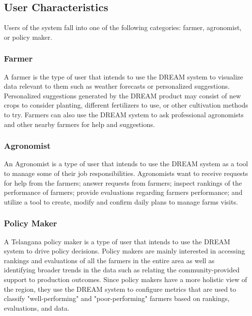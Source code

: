 \subsection{User Characteristics}
\begin{flushleft}
Users of the system fall into one of the following categories: farmer, agronomist, or policy maker.
\subsubsection{Farmer}
A farmer is the type of user that intends to use the DREAM system to visualize data relevant to them such as weather forecasts or personalized suggestions. Personalized suggestions generated by the DREAM product may consist of new crops to consider planting, different fertilizers to use, or other cultivation methods to try. Farmers can also use the DREAM system to ask professional agronomists and other nearby farmers for help and suggestions.\\
\subsubsection{Agronomist}
An Agronomist is a type of user that intends to use the DREAM system as a tool to manage some of their job responsibilities. Agronomists want to receive requests for help from the farmers; answer requests from farmers; inspect rankings of the performance of farmers; provide evaluations regarding farmers performance; and utilize a tool to create, modify and confirm daily plans to manage farms visits.
\subsubsection{Policy Maker}
A Telangana policy maker is a type of user that intends to use the DREAM system to drive policy decisions. Policy makers are mainly interested in accessing rankings and evaluations of all the farmers in the entire area as well as identifying broader trends in the data such as relating the community-provided support to production outcomes. Since policy makers have a more holistic view of the region, they use the DREAM system to configure metrics that are used to classify "well-performing" and "poor-performing" farmers based on rankings, evaluations, and data.\\
\end{flushleft}



